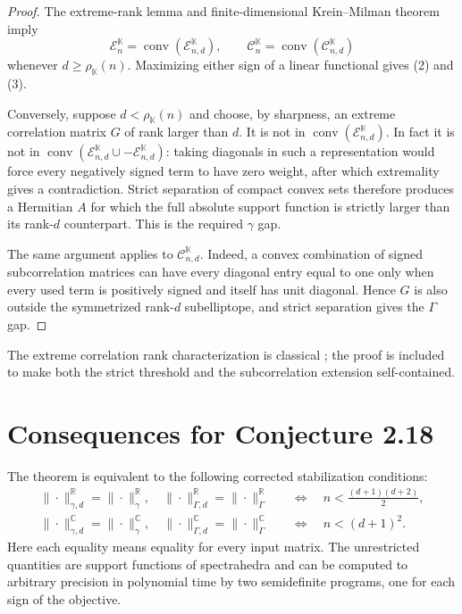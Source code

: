 \documentclass[11pt]{article}
\newcommand{\R}{\mathbb R}
\newcommand{\C}{\mathbb C}
\newcommand{\Ecal}{\mathcal E}
\newcommand{\Ccal}{\mathcal C}
\newcommand{\conv}{\operatorname{conv}}
\begin{document}
\begin{proof}
The extreme-rank lemma and finite-dimensional Krein--Milman theorem imply
\[
 \Ecal_n^{\mathbb K}=\conv(\Ecal_{n,d}^{\mathbb K}),\qquad
 \Ccal_n^{\mathbb K}=\conv(\Ccal_{n,d}^{\mathbb K})
\]
whenever $d\ge\rho_{\mathbb K}(n)$.  Maximizing either sign of a linear
functional gives (2) and (3).

Conversely, suppose $d<\rho_{\mathbb K}(n)$ and choose, by sharpness, an
extreme correlation matrix $G$ of rank larger than $d$.  It is not in
$\conv(\Ecal_{n,d}^{\mathbb K})$.  In fact it is not in
$\conv(\Ecal_{n,d}^{\mathbb K}\cup-\Ecal_{n,d}^{\mathbb K})$: taking
diagonals in such a representation would force every negatively signed term
to have zero weight, after which extremality gives a contradiction.  Strict
separation of compact convex sets therefore produces a Hermitian $A$ for
which the full absolute support function is strictly larger than its
rank-$d$ counterpart.  This is the required $\gamma$ gap.

The same argument applies to $\Ccal_{n,d}^{\mathbb K}$.  Indeed, a convex
combination of signed subcorrelation matrices can have every diagonal entry
equal to one only when every used term is positively signed and itself has
unit diagonal.  Hence $G$ is also outside the symmetrized rank-$d$
subelliptope, and strict separation gives the $\Gamma$ gap.
\end{proof}

The extreme correlation rank characterization is classical
\cite{GPW,LiTam}; the proof is included to make both the strict threshold and
the subcorrelation extension self-contained.

\section{Consequences for Conjecture 2.18}

The theorem is equivalent to the following corrected stabilization conditions:
\begin{align}
 \|\cdot\|_{\gamma,d}^{\R}=\|\cdot\|_{\gamma}^{\R},\quad
 \|\cdot\|_{\Gamma,d}^{\R}=\|\cdot\|_{\Gamma}^{\R}
 &\quad\Longleftrightarrow\quad n<\frac{(d+1)(d+2)}2,\label{eq:realstab}\\
 \|\cdot\|_{\gamma,d}^{\C}=\|\cdot\|_{\gamma}^{\C},\quad
 \|\cdot\|_{\Gamma,d}^{\C}=\|\cdot\|_{\Gamma}^{\C}
 &\quad\Longleftrightarrow\quad n<(d+1)^2.\label{eq:complexstab}
\end{align}
Here each equality means equality for every input matrix.  The unrestricted
quantities are support functions of spectrahedra and can be computed to
arbitrary precision in polynomial time by two semidefinite programs, one for
each sign of the objective.
\end{document}
